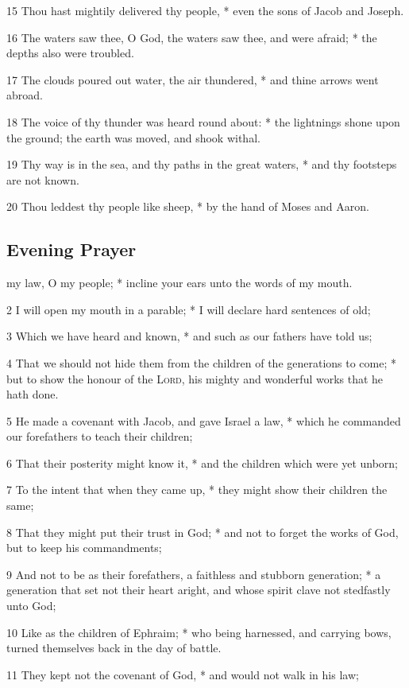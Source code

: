 15 Thou hast mightily delivered thy people, * even the sons of Jacob and Joseph.\par
16 The waters saw thee, O God, the waters saw thee, and were afraid; * the depths also were troubled.\par
17 The clouds poured out water, the air thundered, * and thine arrows went abroad.\par
18 The voice of thy thunder was heard round about: * the lightnings shone upon the ground; the earth was moved, and shook withal.\par
19 Thy way is in the sea, and thy paths in the great waters, * and thy footsteps are not known.\par
20 Thou leddest thy people like sheep, * by the hand of Moses and Aaron.
\subsection{Evening Prayer}
 my law, O my people; * incline your ears unto the words of my mouth.\par
2 I will open my mouth in a parable; * I will declare hard sentences of old;\par
3 Which we have heard and known, * and such as our fathers have told us;\par
4 That we should not hide them from the children of the generations to come; * but to show the honour of the {\textsc{Lord}}, his mighty and wonderful works that he hath done.\par
5 He made a covenant with Jacob, and gave Israel a law, * which he commanded our forefathers to teach their children;\par
6 That their posterity might know it, * and the children which were yet unborn;\par
7 To the intent that when they came up, * they might show their children the same;\par
8 That they might put their trust in God; * and not to forget the works of God, but to keep his commandments;\par
9 And not to be as their forefathers, a faithless and stubborn generation; * a generation that set not their heart aright, and whose spirit clave not stedfastly unto God;\par
10 Like as the children of Ephraim; * who being harnessed, and carrying bows, turned themselves back in the day of battle.\par
11 They kept not the covenant of God, * and would not walk in his law;\par
